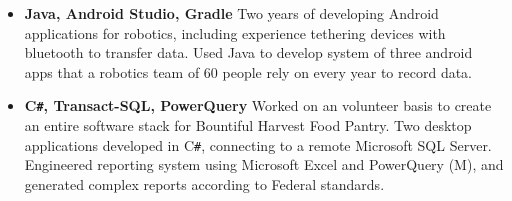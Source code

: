 \documentclass[overlapped]{res}
\begin{document}
\begin{resume}
    \begin{itemize}[label={}]  \itemsep -2pt %
        \item \textbf{Java, Android Studio, Gradle}
              Two years of developing Android applications for robotics, including experience tethering devices with bluetooth to transfer data.
              Used Java to develop system of three android apps that a robotics team of 60 people rely on every year to record data.
        \item \textbf{C\texttt{\#}, Transact-SQL, PowerQuery}
        Worked on an volunteer basis to create an entire software stack for Bountiful Harvest Food Pantry. Two desktop applications developed in C\texttt{\#},
         connecting to a remote Microsoft SQL Server. Engineered reporting system using Microsoft Excel and PowerQuery (M), and generated complex reports according
          to Federal standards.
    \end{itemize}
    

\end{resume}
\end{document}

